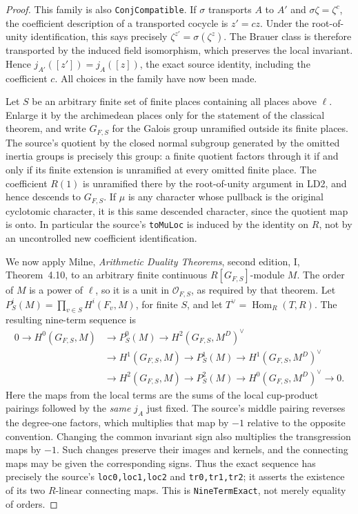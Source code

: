 \begin{proof}
This family is also \texttt{ConjCompatible}.  If $\sigma$ transports
$A$ to $A'$ and $\sigma\zeta=\zeta^c$, the coefficient description
of a transported cocycle is $z'=cz$.  Under the root-of-unity
identification, this says precisely
$\zeta^{z'}=\sigma(\zeta^z)$.  The Brauer class is therefore
transported by the induced field isomorphism, which preserves the
local invariant.  Hence $j_{A'}([z'])=j_A([z])$, the exact source
identity, including the coefficient $c$.  All choices in the family
have now been made.

Let $S$ be an arbitrary finite set of finite places containing all
places above $\ell$.  Enlarge it by the archimedean places only for
the statement of the classical theorem, and write $G_{F,S}$ for the
Galois group unramified outside its finite places.  The source's
quotient by the closed normal subgroup generated by the omitted
inertia groups is precisely this group: a finite quotient factors
through it if and only if its finite extension is unramified at
every omitted finite place.  The coefficient $R(1)$ is unramified
there by the root-of-unity argument in LD2, and hence descends to
$G_{F,S}$.  If $\mu$ is any character whose pullback is the original
cyclotomic character, it is this same descended character, since
the quotient map is onto.  In particular the source's
\texttt{toMuLoc} is induced by the identity on $R$, not by an
uncontrolled new coefficient identification.

We now apply Milne, \emph{Arithmetic Duality Theorems}, second
edition, I, Theorem~4.10, to an arbitrary finite continuous
$R[G_{F,S}]$-module $M$.  The order of $M$ is a power of $\ell$,
so it is a unit in $\mathcal O_{F,S}$, as required by that theorem.
Let $P^i_S(M)=\prod_{v\in S}H^i(F_v,M)$, for finite $S$, and let
$T^\vee=\operatorname{Hom}_R(T,R)$.  The resulting nine-term sequence
is
\[
\begin{aligned}
0\longrightarrow H^0(G_{F,S},M)&\longrightarrow P^0_S(M)
 \longrightarrow H^2(G_{F,S},M^D)^\vee\\
 &\longrightarrow H^1(G_{F,S},M)
 \longrightarrow P^1_S(M)
 \longrightarrow H^1(G_{F,S},M^D)^\vee\\
 &\longrightarrow H^2(G_{F,S},M)
 \longrightarrow P^2_S(M)
 \longrightarrow H^0(G_{F,S},M^D)^\vee\longrightarrow0.
\end{aligned}
 \tag{LD.8}
\]
Here the maps from the local terms are the sums of the local
cup-product pairings followed by the \emph{same} $j_A$ just fixed.
The source's middle pairing reverses the degree-one factors, which
multiplies that map by $-1$ relative to the opposite convention.
Changing the common invariant sign also multiplies the transgression
maps by $-1$.  Such changes preserve their images and kernels, and
the connecting maps may be given the corresponding signs.  Thus
the exact sequence has precisely the source's
\texttt{loc0,loc1,loc2} and \texttt{tr0,tr1,tr2}; it asserts the
existence of its two $R$-linear connecting maps.  This is
\texttt{NineTermExact}, not merely equality of orders.


\end{proof}
